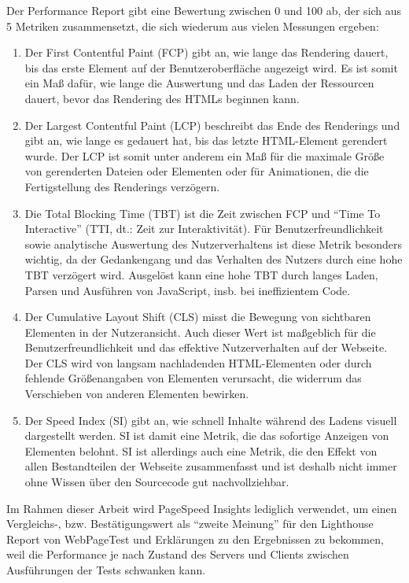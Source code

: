 \documentclass[11pt,a4paper]{article}
\begin{document}
Der Performance Report gibt eine Bewertung zwischen 0 und 100 ab, der sich aus 5 Metriken zusammensetzt, die sich wiederum aus vielen Messungen ergeben:

\begin{enumerate}
  \item Der First Contentful Paint (FCP) gibt an, wie lange das Rendering dauert, bis das erste Element auf der Benutzeroberfläche angezeigt wird.
  Es ist somit ein Maß dafür, wie lange die Auswertung und das Laden der Ressourcen dauert, bevor das Rendering des HTMLs beginnen kann.
  \item Der Largest Contentful Paint (LCP) beschreibt das Ende des Renderings und gibt an, wie lange es gedauert hat, bis das letzte HTML-Element gerendert wurde.
  Der LCP ist somit unter anderem ein Maß für die maximale Größe von gerenderten Dateien oder Elementen oder für Animationen, die die Fertigstellung des Renderings verzögern.
  \item Die Total Blocking Time (TBT) ist die Zeit zwischen FCP und \enquote{Time To Interactive} (TTI, dt.: Zeit zur Interaktivität).
  Für Benutzerfreundlichkeit sowie analytische Auswertung des Nutzerverhaltens ist diese Metrik besonders wichtig, da der Gedankengang und das Verhalten des Nutzers durch eine hohe TBT verzögert wird.
  Ausgelöst kann eine hohe TBT durch langes Laden, Parsen und Ausführen von JavaScript, insb. bei ineffizientem Code.
  \item Der Cumulative Layout Shift (CLS) misst die Bewegung von sichtbaren Elementen in der Nutzeransicht. Auch dieser Wert ist maßgeblich für die Benutzerfreundlichkeit und das effektive Nutzerverhalten auf der Webseite.
  Der CLS wird von langsam nachladenden HTML-Elementen oder durch fehlende Größenangaben von Elementen verursacht, die widerrum das Verschieben von anderen Elementen bewirken.
  \item Der Speed Index (SI) gibt an, wie schnell Inhalte während des Ladens visuell dargestellt werden. SI ist damit eine Metrik, die das sofortige Anzeigen von Elementen belohnt.
  SI ist allerdings auch eine Metrik, die den Effekt von allen Bestandteilen der Webseite zusammenfasst und ist deshalb nicht immer ohne Wissen über den Sourcecode gut nachvollziehbar. 
\end{enumerate}

Im Rahmen dieser Arbeit wird PageSpeed Insights lediglich verwendet, um einen Vergleichs-, bzw. Bestätigungswert als \enquote{zweite Meinung} für den Lighthouse Report von WebPageTest und Erklärungen zu den Ergebnissen zu bekommen, weil die Performance je nach Zustand des Servers und Clients zwischen Ausführungen der Tests schwanken kann.
\end{document}
